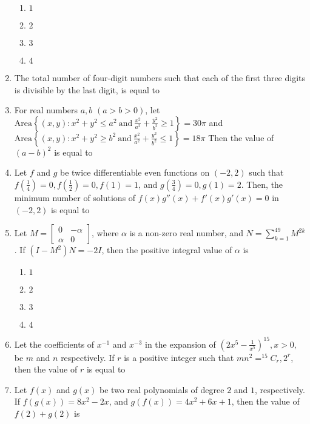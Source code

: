 \documentclass[journal,12pt,onecolumn]{IEEEtran}
\theoremstyle{remark}
\begin{document}
\begin{enumerate}
\begin{enumerate}
    \item $1$
    \item $2$
    \item $3$
    \item $4$
\end{enumerate}
\item The total number of four-digit numbers such that each of the first three digits is divisible by the last digit, is equal to 
\item For real numbers $a, b$ $(a > b > 0)$, let $ \text{Area}\left\{ (x, y) : x^2 + y^2 \leq a^2 \ \text{and} \ \frac{x^2}{a^2} + \frac{y^2}{b^2} \geq 1 \right\} = 30\pi $ and $ \text{Area}\left\{ (x, y) : x^2 + y^2 \geq b^2 \ \text{and} \ \frac{x^2}{a^2} + \frac{y^2}{b^2} \leq 1 \right\} = 18\pi $ Then the value of $(a - b)^2$ is equal to
\item Let $f$ and $g$ be twice differentiable even functions on $(-2,2)$ such that $f\left(\frac{1}{4}\right) = 0, f\left(\frac{1}{2}\right) = 0, f(1) = 1$, and $g\left(\frac{3}{4}\right) = 0, g(1) = 2$. Then, the minimum number of solutions of $f(x) g''(x) + f'(x) g'(x) = 0$ in $(-2,2)$ is equal to
\item Let $M = \begin{bmatrix} 0 & -\alpha \\ \alpha & 0 \end{bmatrix}$, where $\alpha$ is a non-zero real number, and $N = \sum_{k=1}^{49} M^{2k}$. If $(I - M^2)N = -2I$, then the positive integral value of $\alpha$ is
\begin{enumerate}
    \item $1$
    \item $2$
    \item $3$
    \item $4$
\end{enumerate}
\item Let the coefficients of $x^{-1}$ and $x^{-3}$ in the expansion of $\left( 2x^5 - \frac{1}{x^5} \right)^{15}, x > 0,$ be $m$ and $n$ respectively. If $r$ is a positive integer such that $mn^2 = ^{15}C_r, 2^r$, then the value of $r$ is equal to
\item Let $f(x)$ and $g(x)$ be two real polynomials of degree $2$ and $1$, respectively. If $f(g(x)) = 8x^2 - 2x$, and $g(f(x)) = 4x^2 + 6x + 1$, then the value of $f(2) + g(2)$ is
\end{enumerate}
\end{document}
